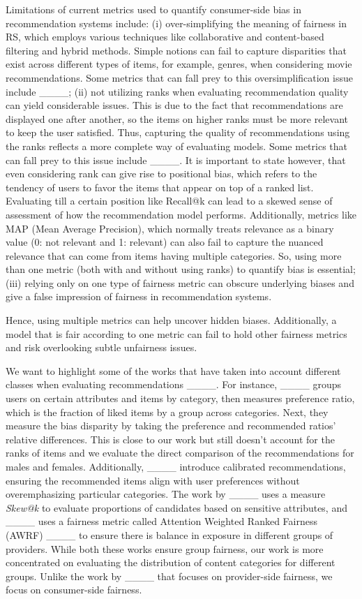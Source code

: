  
Limitations of current metrics used to quantify consumer-side bias in recommendation systems include: (i) over-simplifying the meaning of fairness in RS, which employs various techniques like collaborative and content-based filtering and hybrid methods.
Simple notions can fail to capture disparities that exist across different types of items, for example, genres, when considering movie recommendations. Some metrics that can fall prey to this oversimplification issue include ____;
(ii) not utilizing ranks when evaluating recommendation quality can yield considerable issues. 
This is due to the fact that recommendations are displayed one after another, so the items on higher ranks must be more relevant to keep the user satisfied. 
Thus, capturing the quality of recommendations using the ranks reflects a more complete way of evaluating models. 
Some metrics that can fall prey to this issue include ____.
It is important to state however, that even considering rank can give rise to positional bias, which refers to the tendency of users to favor the items that appear on top of a ranked list. 
Evaluating till a certain position like Recall@k can lead to a skewed sense of assessment of how the recommendation model performs. 
Additionally, metrics like MAP (Mean Average Precision), which normally treats relevance as a binary value (0: not relevant and 1: relevant) can also fail to capture the nuanced relevance that can come from items having multiple categories. 
So, using more than one metric (both with and without using ranks) to quantify bias is essential; 
(iii) relying only on one type of fairness metric can obscure underlying biases and give a false impression of fairness in recommendation systems. 

Hence, using multiple metrics can help uncover hidden biases. Additionally, a model that is fair according to one metric can fail to hold other fairness metrics and risk overlooking subtle unfairness issues.



We want to highlight some of the works that have taken into account different classes when evaluating recommendations ____.
For instance, ____ groups users on certain attributes and items by category, then measures preference ratio, which is the fraction of liked items by a group across categories. Next, they measure the bias disparity by taking the preference and recommended ratios' relative differences. This is close to our work but still doesn't account for the ranks of items and we evaluate the direct comparison of the recommendations for males and females. Additionally, ____ introduce calibrated recommendations, ensuring the recommended items align with user preferences without overemphasizing particular categories. The work by ____ uses a measure \textit{Skew@k} to evaluate proportions of candidates based on sensitive attributes, and ____ uses a fairness metric called Attention Weighted Ranked Fairness (AWRF) ____ to ensure there is balance in exposure in different groups of providers. While both these works ensure group fairness, our work is more concentrated on evaluating the distribution of content categories for different groups. Unlike the work by ____ that focuses on provider-side fairness, we focus on consumer-side fairness.